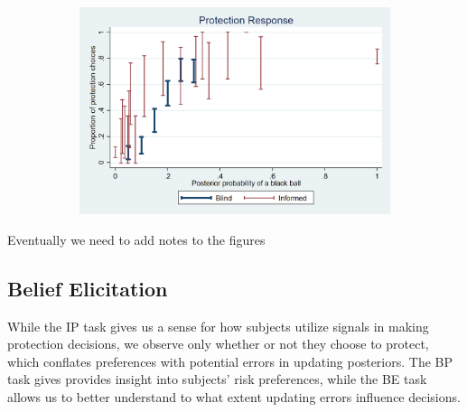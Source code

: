 \documentclass[12pt,a4paper]{article}
\newcommand{\pmt}[1]{{\color{Blue}#1}}
\begin{document}

\begin{figure}[H]
\centering
\caption{Average Protection Response} \label{fig:ProtResponse}
\begin{subfigure}[t]{.75\textwidth}
  \centering
  \includegraphics[width=\textwidth]{Graphs/ip_response_comp.png}
\end{subfigure}
%
\end{figure}
\pmt{Eventually we need to add notes to the figures}

\subsection{Belief Elicitation}
While the IP task gives us a sense for how subjects utilize signals in making protection decisions, we observe only whether or not they choose to protect, which conflates preferences with potential errors in updating posteriors.  The BP task gives provides insight into subjects' risk preferences, while the BE task allows us to better understand to what extent updating errors influence decisions.  
\end{document}
